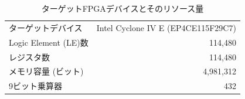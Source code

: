 \documentclass{jarticle}[11pt]
\begin{document}
\begin{table}[tb]
\caption{ターゲットFPGAデバイスとそのリソース量}
\label{tab:ターゲットFPGAデバイスとそのリソース量}
\begin{center}
\begin{tabular}{l|r}
\hline \hline
ターゲットデバイス & Intel Cyclone IV E (EP4CE115F29C7) \\
Logic Element (LE)数 & 114,480 \\
レジスタ数 & 114,480 \\
メモリ容量 (ビット) & 4,981,312\\
9ビット乗算器 & 432 \\
\hline
\end{tabular}
\end{center}
\end{table}

%
\end{document}

